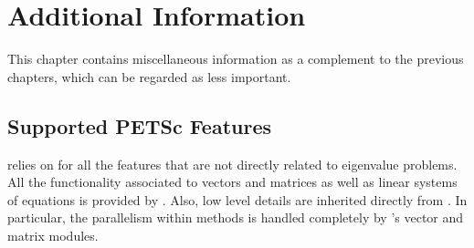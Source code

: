 \chapter{\label{cap:add}Additional Information}

\noindent This chapter contains miscellaneous information as a complement to the previous chapters, which can be regarded as less important.

\section{Supported PETSc Features}

\slepc relies on \petsc for all the features that are not directly related to eigenvalue problems. All the functionality associated to vectors and matrices as well as linear systems of equations is provided by \petsc. Also, low level details are inherited directly from \petsc. In particular, the parallelism within \slepc methods is handled completely by \petsc's vector and matrix modules. 


